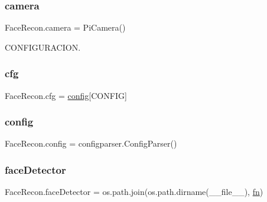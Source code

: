 \subsubsection{\texorpdfstring{camera}{camera}}
{\footnotesize\ttfamily Face\+Recon.\+camera = Pi\+Camera()}



C\+O\+N\+F\+I\+G\+U\+R\+A\+C\+I\+ON. 

\mbox{\label{namespace_face_recon_a6a0cb127a374ad0eb5705d0f49a40040}} 
\subsubsection{\texorpdfstring{cfg}{cfg}}
{\footnotesize\ttfamily Face\+Recon.\+cfg = \mbox{\hyperlink{namespace_face_recon_a020b74724169b8fc02c88453680fa3cc}{config}}\mbox{[}\textquotesingle{}C\+O\+N\+F\+IG\textquotesingle{}\mbox{]}}

\mbox{\label{namespace_face_recon_a020b74724169b8fc02c88453680fa3cc}} 
\subsubsection{\texorpdfstring{config}{config}}
{\footnotesize\ttfamily Face\+Recon.\+config = configparser.\+Config\+Parser()}

\mbox{\label{namespace_face_recon_a52d7b32070be8a278850cdb6afd2d301}} 
\subsubsection{\texorpdfstring{face\+Detector}{faceDetector}}
{\footnotesize\ttfamily Face\+Recon.\+face\+Detector = os.\+path.\+join(os.\+path.\+dirname(\+\_\+\+\_\+file\+\_\+\+\_\+), \mbox{\hyperlink{namespace_face_recon_aaadefd1ee1352d2f1b2fdf3ea4db8390}{fn}})}

\mbox{\label{namespace_face_recon_aaf2856e061dd5456e2ff875905fcc51b}} 
